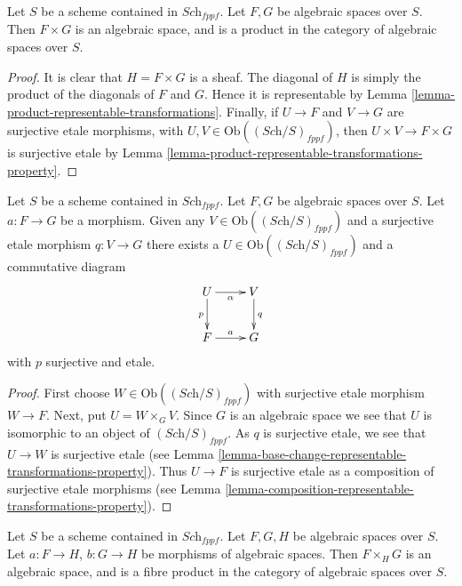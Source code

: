 \begin{lemma}
\label{lemma-product-spaces}
Let $S$ be a scheme contained in $\textit{Sch}_{fppf}$.
Let $F, G$ be algebraic spaces over $S$.
Then $F \times G$ is an algebraic space, and is a product
in the category of algebraic spaces over $S$.
\end{lemma}

\begin{proof}
It is clear that $H = F \times G$ is a sheaf.
The diagonal of $H$ is simply the product of the
diagonals of $F$ and $G$. Hence it is representable by
Lemma \ref{lemma-product-representable-transformations}.
Finally, if $U \to F$ and $V \to G$ are surjective
etale morphisms, with $U, V \in \text{Ob}((\textit{Sch}/S)_{fppf})$,
then $U \times V \to F \times G$ is surjective etale
by Lemma \ref{lemma-product-representable-transformations-property}.
\end{proof}

\begin{lemma}
\label{lemma-lift-morphism-presentations}
Let $S$ be a scheme contained in $\textit{Sch}_{fppf}$.
Let $F, G$ be algebraic spaces over $S$.
Let $a : F \to G$ be a morphism.
Given any $V \in \text{Ob}((\textit{Sch}/S)_{fppf})$
and a surjective etale morphism $q : V \to G$ there exists
a $U \in \text{Ob}((\textit{Sch}/S)_{fppf})$
and a commutative diagram
$$
\xymatrix{
U \ar[d]_p \ar[r]_\alpha &
V \ar[d]^q \\
F \ar[r]^a & G
}
$$
with $p$ surjective and etale.
\end{lemma}

\begin{proof}
First choose $W \in \text{Ob}((\textit{Sch}/S)_{fppf})$
with surjective etale morphism $W \to F$.
Next, put $U = W \times_G V$. Since $G$ is an algebraic space
we see that $U$ is isomorphic to an object of $(\textit{Sch}/S)_{fppf}$.
As $q$ is surjective etale, we see that $U \to W$ is surjective
etale (see
Lemma \ref{lemma-base-change-representable-transformations-property}).
Thus $U \to F$ is surjective etale as a composition of surjective
etale morphisms (see
Lemma \ref{lemma-composition-representable-transformations-property}).
\end{proof}

\begin{lemma}
\label{lemma-fibre-product-spaces}
Let $S$ be a scheme contained in $\textit{Sch}_{fppf}$.
Let $F, G, H$ be algebraic spaces over $S$.
Let $a : F \to H$, $b : G \to H$ be morphisms of algebraic spaces.
Then $F \times_H G$ is an algebraic space, and is a fibre product
in the category of algebraic spaces over $S$.
\end{lemma}


